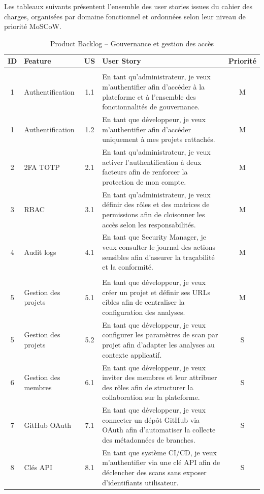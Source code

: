 Les tableaux suivants présentent l'ensemble des user stories issues du cahier des
charges, organisées par domaine fonctionnel et ordonnées selon leur niveau de priorité
MoSCoW.

\begin{table}[H]
\centering
\caption{Product Backlog -- Gouvernance et gestion des accès}
\label{tab:backlog-gouvernance}
\small
\renewcommand{\arraystretch}{1.2}
\begin{tabularx}{\textwidth}{c X c X c}
\hline
\rowcolor{gray!15}
\textbf{ID} & \textbf{Feature} & \textbf{US} & \textbf{User Story} & \textbf{Priorité} \\
\hline
\rowcolor{gray!10}
\multicolumn{5}{c}{\textbf{Module Gouvernance et Accès}} \\
\hline
1 & Authentification & 1.1
  & En tant qu'administrateur, je veux m'authentifier afin d'accéder à la plateforme
    et à l'ensemble des fonctionnalités de gouvernance. & M \\
1 & Authentification & 1.2
  & En tant que développeur, je veux m'authentifier afin d'accéder uniquement à
    mes projets rattachés. & M \\
2 & 2FA TOTP & 2.1
  & En tant qu'administrateur, je veux activer l'authentification à deux facteurs
    afin de renforcer la protection de mon compte. & M \\
3 & RBAC & 3.1
  & En tant qu'administrateur, je veux définir des rôles et des matrices de
    permissions afin de cloisonner les accès selon les responsabilités. & M \\
4 & Audit logs & 4.1
  & En tant que Security Manager, je veux consulter le journal des actions sensibles
    afin d'assurer la traçabilité et la conformité. & M \\
\hline
\rowcolor{gray!10}
\multicolumn{5}{c}{\textbf{Module Projets et Intégrations}} \\
\hline
5 & Gestion des projets & 5.1
  & En tant que développeur, je veux créer un projet et définir ses URLs cibles
    afin de centraliser la configuration des analyses. & M \\
5 & Gestion des projets & 5.2
  & En tant que développeur, je veux configurer les paramètres de scan par projet
    afin d'adapter les analyses au contexte applicatif. & S \\
6 & Gestion des membres & 6.1
  & En tant que développeur, je veux inviter des membres et leur attribuer des rôles
    afin de structurer la collaboration sur la plateforme. & S \\
7 & GitHub OAuth & 7.1
  & En tant que développeur, je veux connecter un dépôt GitHub via OAuth afin
    d'automatiser la collecte des métadonnées de branches. & S \\
8 & Clés API & 8.1
  & En tant que système CI/CD, je veux m'authentifier via une clé API afin de
    déclencher des scans sans exposer d'identifiants utilisateur. & S \\
\hline
\end{tabularx}
\end{table}

